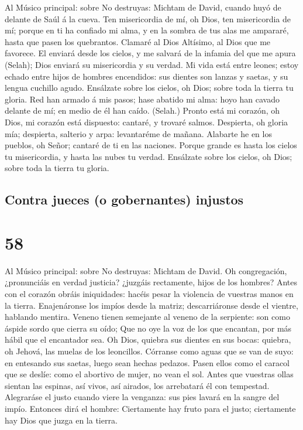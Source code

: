  Al Músico principal: sobre No destruyas: Michtam de
David, cuando huyó de delante de Saúl á la cueva. Ten misericordia de
mí, oh Dios, ten misericordia de mí; porque en ti ha confiado mi alma, y
en la sombra de tus alas me ampararé, hasta que pasen los quebrantos.
 Clamaré al Dios Altísimo, al Dios que me favorece.
 El enviará desde los cielos, y me salvará de la infamia
del que me apura (Selah); Dios enviará su misericordia y su verdad.
 Mi vida está entre leones; estoy echado entre hijos de
hombres encendidos: sus dientes son lanzas y saetas, y su lengua
cuchillo agudo.  Ensálzate sobre los cielos, oh Dios;
sobre toda la tierra tu gloria.  Red han armado á mis
pasos; hase abatido mi alma: hoyo han cavado delante de mí; en medio de
él han caído. (Selah.)  Pronto está mi corazón, oh Dios,
mi corazón está dispuesto: cantaré, y trovaré salmos. 
Despierta, oh gloria mía; despierta, salterio y arpa: levantaréme de
mañana.  Alabarte he en los pueblos, oh Señor; cantaré de
ti en las naciones.  Porque grande es hasta los cielos tu
misericordia, y hasta las nubes tu verdad.  Ensálzate
sobre los cielos, oh Dios; sobre toda la tierra tu gloria.

\hypertarget{contra-jueces-o-gobernantes-injustos}{%
\subsection{Contra jueces (o gobernantes)
injustos}\label{contra-jueces-o-gobernantes-injustos}}

\hypertarget{section-57}{%
\section{58}\label{section-57}}

 Al Músico principal: sobre No destruyas: Michtam de
David. Oh congregación, ¿pronunciáis en verdad justicia? ¿juzgáis
rectamente, hijos de los hombres?  Antes con el corazón
obráis iniquidades: hacéis pesar la violencia de vuestras manos en la
tierra.  Enajenáronse los impíos desde la matriz;
descarriáronse desde el vientre, hablando mentira.  Veneno
tienen semejante al veneno de la serpiente: son como áspide sordo que
cierra su oído;  Que no oye la voz de los que encantan,
por más hábil que el encantador sea.  Oh Dios, quiebra sus
dientes en sus bocas: quiebra, oh Jehová, las muelas de los leoncillos.
 Córranse como aguas que se van de suyo: en entesando sus
saetas, luego sean hechas pedazos.  Pasen ellos como el
caracol que se deslíe: como el abortivo de mujer, no vean el sol.
 Antes que vuestras ollas sientan las espinas, así vivos,
así airados, los arrebatará él con tempestad.  Alegraráse
el justo cuando viere la venganza: sus pies lavará en la sangre del
impío.  Entonces dirá el hombre: Ciertamente hay fruto
para el justo; ciertamente hay Dios que juzga en la tierra.

